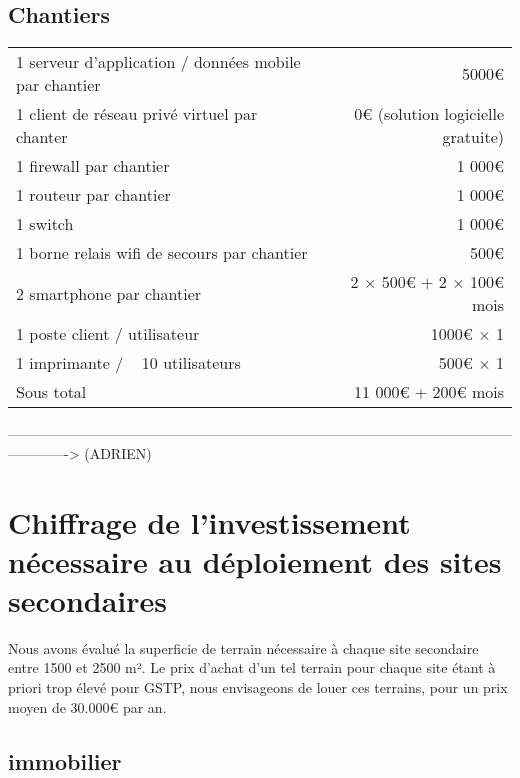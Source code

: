     \subsection{Chantiers}
        \begin{tabular*}{\textwidth}{ l @{\extracolsep{\fill}} r }
1 serveur d'application / données mobile par chantier & 5000€ \\
1 client de réseau privé virtuel par chanter & 0€ (solution logicielle gratuite)\\
1 firewall par chantier & 1 000€ \\
1 routeur par chantier & 1 000€ \\
1 switch & 1 000€ \\
1 borne relais wifi de secours par chantier & 500€ \\
2 smartphone par chantier & 2 $\times$ 500€ + 2 $\times$ 100€ \/ mois\\
1 poste client / utilisateur & 1000€ $\times$ 1 \\
1 imprimante / ~ 10 utilisateurs & 500€ $\times$ 1 \\ \hline
Sous total & 11 000€ + 200€ \/mois
        \end{tabular*}


-------------------------------------------------------------------------------------------------------------------------> (ADRIEN)

\section{Chiffrage de l'investissement nécessaire au déploiement des sites secondaires}

Nous avons évalué la superficie de terrain nécessaire à chaque site secondaire entre 1500 et 2500 m². Le prix d'achat d'un tel terrain pour chaque site étant à priori trop élevé pour GSTP, nous envisageons de louer ces terrains, pour un prix moyen de 30.000€ par an.

\subsection{immobilier}

